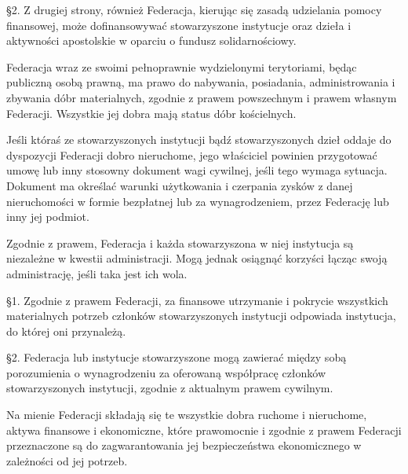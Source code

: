 \S{}2. Z drugiej strony, również Federacja, kierując się zasadą udzielania pomocy finansowej, może dofinansowywać stowarzyszone instytucje oraz dzieła i aktywności apostolskie w oparciu o fundusz solidarnościowy.




 Federacja wraz ze swoimi pełnoprawnie wydzielonymi terytoriami, będąc publiczną osobą prawną, ma prawo do nabywania, posiadania, administrowania i zbywania dóbr materialnych, zgodnie z prawem powszechnym i prawem własnym Federacji. Wszystkie jej dobra mają status dóbr kościelnych.
 




 Jeśli któraś ze stowarzyszonych instytucji bądź stowarzyszonych dzieł oddaje do dyspozycji Federacji dobro nieruchome, jego właściciel powinien przygotować umowę lub inny stosowny dokument wagi cywilnej, jeśli tego wymaga sytuacja. Dokument ma określać warunki użytkowania i czerpania zysków z danej nieruchomości w formie bezpłatnej lub za wynagrodzeniem, przez Federację lub inny jej podmiot.
 


 Zgodnie z prawem, Federacja i każda stowarzyszona w niej instytucja są niezależne w kwestii administracji. Mogą jednak osiągnąć korzyści łącząc swoją administrację, jeśli taka jest ich wola.
 


 \S{}1. Zgodnie z prawem Federacji, za finansowe utrzymanie i pokrycie wszystkich materialnych potrzeb członków stowarzyszonych instytucji odpowiada instytucja, do której oni przynależą.


\S{}2. Federacja lub instytucje stowarzyszone mogą zawierać między sobą porozumienia o wynagrodzeniu za oferowaną współpracę członków stowarzyszonych instytucji, zgodnie z aktualnym prawem cywilnym.






 Na mienie Federacji składają się te wszystkie dobra ruchome i nieruchome, aktywa finansowe i ekonomiczne, które prawomocnie i zgodnie z prawem Federacji przeznaczone są do zagwarantowania jej bezpieczeństwa ekonomicznego w zależności od jej potrzeb.


 



